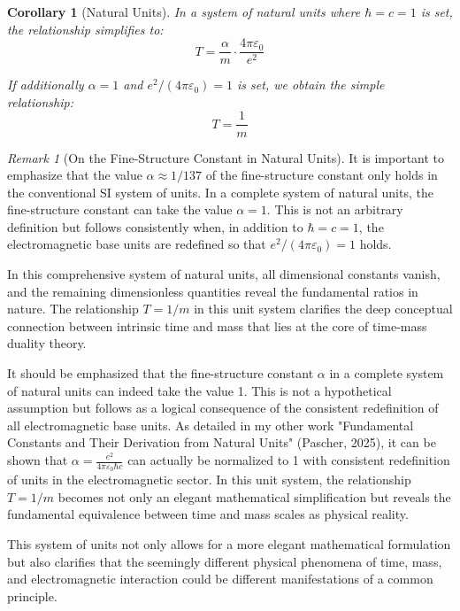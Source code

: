 \documentclass{article}
\newtheorem{corollary}[theorem]{Corollary}
\theoremstyle{definition}
\theoremstyle{remark}
\newtheorem{remark}[theorem]{Remark}
\begin{document}
	\begin{corollary}[Natural Units]
		In a system of natural units where $\hbar = c = 1$ is set, the relationship simplifies to:
		\begin{equation}
			T = \frac{\alpha}{m} \cdot \frac{4\pi\varepsilon_0}{e^2}
		\end{equation}
		
		If additionally $\alpha = 1$ and $e^2/(4\pi\varepsilon_0) = 1$ is set, we obtain the simple relationship:
		\begin{equation}
			T = \frac{1}{m}
		\end{equation}
	\end{corollary}
	
	\begin{remark}[On the Fine-Structure Constant in Natural Units]
		It is important to emphasize that the value $\alpha \approx 1/137$ of the fine-structure constant only holds in the conventional SI system of units. In a complete system of natural units, the fine-structure constant can take the value $\alpha = 1$. This is not an arbitrary definition but follows consistently when, in addition to $\hbar = c = 1$, the electromagnetic base units are redefined so that $e^2/(4\pi\varepsilon_0) = 1$ holds. 
		
		In this comprehensive system of natural units, all dimensional constants vanish, and the remaining dimensionless quantities reveal the fundamental ratios in nature. The relationship $T = 1/m$ in this unit system clarifies the deep conceptual connection between intrinsic time and mass that lies at the core of time-mass duality theory.
		
		It should be emphasized that the fine-structure constant $\alpha$ in a complete system of natural units can indeed take the value 1. This is not a hypothetical assumption but follows as a logical consequence of the consistent redefinition of all electromagnetic base units. As detailed in my other work "Fundamental Constants and Their Derivation from Natural Units" (Pascher, 2025), it can be shown that $\alpha = \frac{e^2}{4\pi\varepsilon_0\hbar c}$ can actually be normalized to 1 with consistent redefinition of units in the electromagnetic sector. In this unit system, the relationship $T = 1/m$ becomes not only an elegant mathematical simplification but reveals the fundamental equivalence between time and mass scales as physical reality.
		
		This system of units not only allows for a more elegant mathematical formulation but also clarifies that the seemingly different physical phenomena of time, mass, and electromagnetic interaction could be different manifestations of a common principle.
	\end{remark}
	
\end{document}
